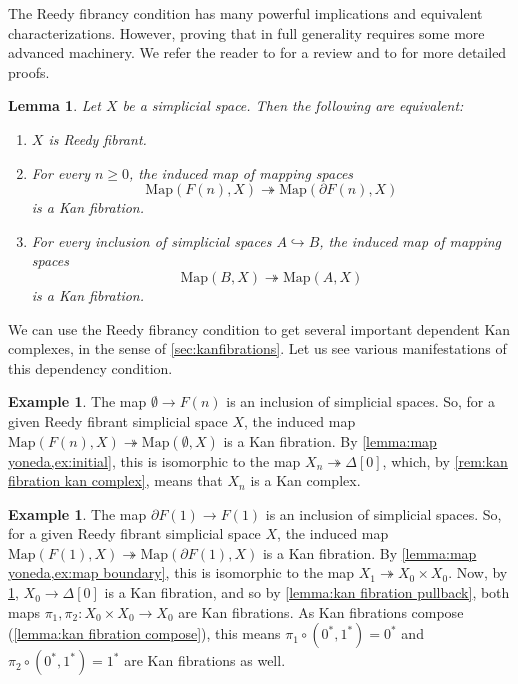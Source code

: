 \documentclass[11pt, a4paper]{amsart}
\newcommand{\Map}{\mathrm{Map}}
\newtheorem{lemma}[equation]{Lemma}
\theoremstyle{definition}
\newtheorem{example}[equation]{Example}
\theoremstyle{remark}
\numberwithin{equation}{section}
\begin{document}
The Reedy fibrancy condition has many powerful implications and equivalent characterizations. However, proving that in full generality requires some more advanced machinery. We refer the reader to \cite[Section 2.5]{rezk2001css} for a review and to \cite[Proposition 9.3.1, Theorem 15.3.4]{hirschhorn2003modelcategories} for more detailed proofs.
\begin{lemma}\label{lemma:reedy}
 Let $X$ be a simplicial space. Then the following are equivalent:
  \begin{enumerate}
   \item $X$ is Reedy fibrant.
   \item For every $n \geq 0$, the induced map of mapping spaces
   \[\Map(F(n), X) \twoheadrightarrow \Map(\partial F(n), X)\]
   is a Kan fibration.
   \item For every inclusion of simplicial spaces $A \hookrightarrow B$, the induced map of mapping spaces
   \[\Map(B, X) \twoheadrightarrow \Map(A, X)\]
   is a Kan fibration.
  \end{enumerate}
\end{lemma}

We can use the Reedy fibrancy condition to get several important dependent Kan complexes, in the sense of \cref{sec:kanfibrations}. Let us see various manifestations of this dependency condition.

\begin{example} \label{ex:reedy fibrant zero}
  The map $\emptyset \to F(n)$ is an inclusion of simplicial spaces. So, for a given Reedy fibrant simplicial space $X$, the induced map $\Map(F(n), X) \twoheadrightarrow \Map(\emptyset, X)$ is a Kan fibration. By \cref{lemma:map yoneda,ex:initial}, this is isomorphic to the map $X_n \twoheadrightarrow \Delta[0]$, which, by \cref{rem:kan fibration kan complex}, means that $X_n$ is a Kan complex.
\end{example}

\begin{example} \label{ex:reedy fibrant one}
  The map $\partial F(1) \to F(1)$ is an inclusion of simplicial spaces. So, for a given Reedy fibrant simplicial space $X$, the induced map $\Map(F(1), X) \twoheadrightarrow \Map(\partial F(1), X)$ is a Kan fibration. By \cref{lemma:map yoneda,ex:map boundary}, this is isomorphic to the map $X_1 \twoheadrightarrow X_0 \times X_0$. Now, by \cref{ex:reedy fibrant zero}, $X_0 \to \Delta[0]$ is a Kan fibration, and so by \cref{lemma:kan fibration pullback}, both maps $\pi_1, \pi_2\colon X_0 \times X_0 \to X_0$ are Kan fibrations. As Kan fibrations compose (\cref{lemma:kan fibration compose}), this means $\pi_1 \circ (0^*,1^*) = 0^*$ and $\pi_2 \circ (0^*,1^*) = 1^*$ are Kan fibrations as well.
\end{example}
\end{document}
